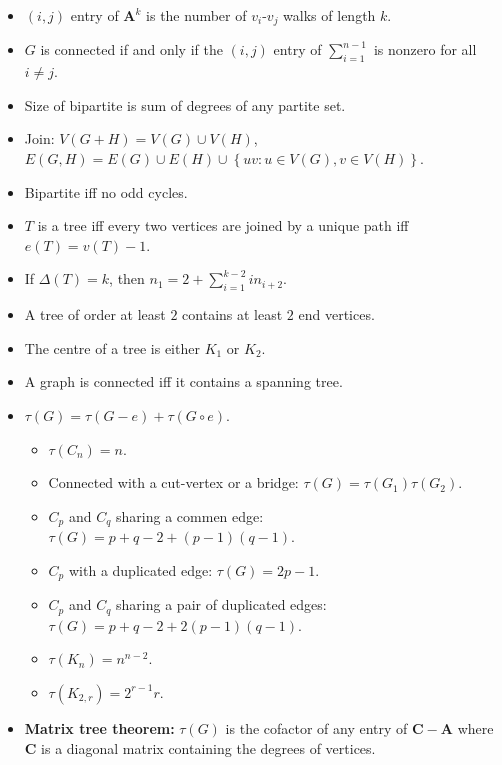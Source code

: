 \documentclass[11pt]{article}
\begin{document}
\begin{multicols*}{3}
\begin{itemize}
            \item $(i, j)$ entry of $\bm{A}^k$ is the number of $v_i$-$v_j$ walks of length $k$.
            \item $G$ is connected if and only if the $(i, j)$ entry of $\sum_{i = 1}^{n - 1}$ is nonzero for all $i \neq j$.
            \item Size of bipartite is sum of degrees of any partite set.
            \item Join: $V(G + H) = V(G) \cup V(H)$, $E(G, H) = E(G) \cup E(H) \cup \left\{uv \colon u \in V(G), v \in V(H)\right\}$.
            \item Bipartite iff no odd cycles.
            \item $T$ is a tree iff every two vertices are joined by a unique path iff $e(T) = v(T) - 1$.
            \item If $\Delta(T) = k$, then $n_1 = 2 + \sum_{i = 1}^{k - 2}in_{i + 2}$.
            \item A tree of order at least $2$ contains at least $2$ end vertices.
            \item The centre of a tree is either $K_1$ or $K_2$.
            \item A graph is connected iff it contains a spanning tree.
            \item $\tau(G) = \tau(G - e) + \tau(G \circ e)$.
            \begin{itemize}
                \item $\tau(C_n) = n$.
                \item Connected with a cut-vertex or a bridge: $\tau(G) = \tau(G_1)\tau(G_2)$.
                \item $C_p$ and $C_q$ sharing a commen edge: $\tau(G) = p + q - 2 + (p - 1)(q - 1)$.
                \item $C_p$ with a duplicated edge: $\tau(G) = 2p - 1$.
                \item $C_p$ and $C_q$ sharing a pair of duplicated edges: $\tau(G) = p + q - 2 + 2(p - 1)(q - 1)$.
                \item $\tau(K_n) = n^{n - 2}$.
                \item $\tau(K_{2, r}) = 2^{r - 1}r$.
            \end{itemize}
            \item \textbf{Matrix tree theorem:} $\tau(G)$ is the cofactor of any entry of $\bm{C - A}$ where $\bm{C}$ is a diagonal matrix containing the degrees of vertices.
        \end{itemize}
        
        
    \end{multicols*}
\end{document}
